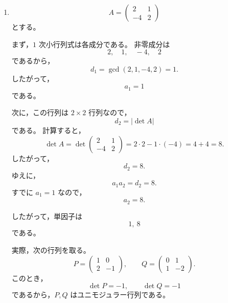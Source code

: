 \begin{solution}
\begin{enumerate}
		したがって，単因子は
		\[
		\boxed{1,\ 2,\ 12}
		\]
		である。
		
		実際，次の行列を取る。
		\[
		P=
		\begin{pmatrix}
			1&1&0\\
			-3&-2&1\\
			6&4&-3
		\end{pmatrix},
		\qquad
		Q=
		\begin{pmatrix}
			-1&-3&-6\\
			1&2&4\\
			0&-1&-3
		\end{pmatrix}.
		\]
		このとき，
		\[
		\det P=-1,
		\qquad
		\det Q=-1
		\]
		なので，\(P,Q\) はユニモジュラー行列である。
		
		さらに直接計算すると，
		\[
		PAQ
		=
		\begin{pmatrix}
			1&0&0\\
			0&2&0\\
			0&0&12
		\end{pmatrix}.
		\]
		したがって，
		\[
		\boxed{
			PAQ=\operatorname{diag}(1,2,12)
		}
		\]
		である。
		
		\item
		\[
		A=
		\begin{pmatrix}
			2&1\\
			-4&2
		\end{pmatrix}
		\]
		とする。
		
		まず，\(1\) 次小行列式は各成分である。
		非零成分は
		\[
		2,\quad 1,\quad -4,\quad 2
		\]
		であるから，
		\[
		d_1=\gcd(2,1,-4,2)=1.
		\]
		したがって，
		\[
		a_1=1
		\]
		である。
		
		次に，この行列は \(2\times 2\) 行列なので，
		\[
		d_2=|\det A|
		\]
		である。
		計算すると，
		\[
		\det A
		=
		\det
		\begin{pmatrix}
			2&1\\
			-4&2
		\end{pmatrix}
		=
		2\cdot 2-1\cdot(-4)
		=
		4+4
		=
		8.
		\]
		したがって，
		\[
		d_2=8.
		\]
		ゆえに，
		\[
		a_1a_2=d_2=8.
		\]
		すでに \(a_1=1\) なので，
		\[
		a_2=8.
		\]
		
		したがって，単因子は
		\[
		\boxed{1,\ 8}
		\]
		である。
		
		実際，次の行列を取る。
		\[
		P=
		\begin{pmatrix}
			1&0\\
			2&-1
		\end{pmatrix},
		\qquad
		Q=
		\begin{pmatrix}
			0&1\\
			1&-2
		\end{pmatrix}.
		\]
		このとき，
		\[
		\det P=-1,
		\qquad
		\det Q=-1
		\]
		であるから，\(P,Q\) はユニモジュラー行列である。
		

\end{enumerate}
\end{solution}
